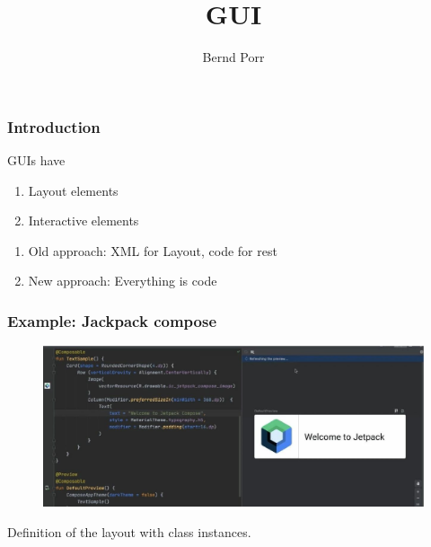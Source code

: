 \documentclass[xcolor=dvipsnames]{beamer}
\date{}
\title{GUI}
\author{Bernd Porr}
\begin{document}
\begin{frame}
\titlepage
\end{frame}




\begin{frame}[fragile]
  \frametitle{Introduction}

  GUIs have
  \begin{enumerate}
  \item Layout elements
  \item Interactive elements
  \end{enumerate}

  \begin{enumerate}
  \item Old approach: XML for Layout, code for rest
  \item New approach: Everything is code
  \end{enumerate}
  
\end{frame}



\begin{frame}[fragile]
  \frametitle{Example: Jackpack compose}
\begin{figure}[!hbt]
\begin{center}
\mbox{\includegraphics[width=\textwidth]{jetpack}}
\end{center}
\end{figure}
Definition of the layout with class instances.
\end{frame}
\end{document}
